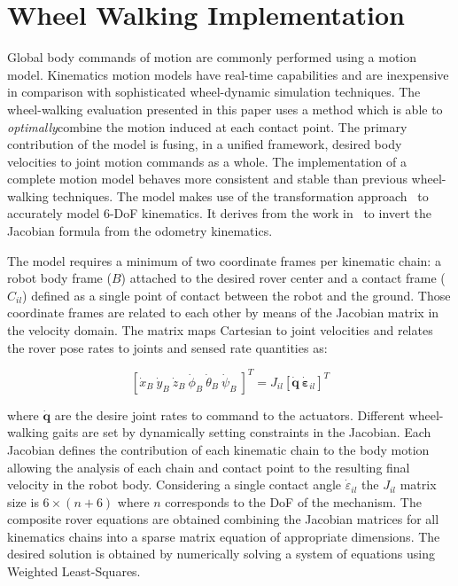 \documentclass[a4paper,twocolumn]{esapub2005} %
\begin{document}
\section{Wheel Walking Implementation}

Global body commands of motion are commonly performed using a motion model.
Kinematics motion models have real-time capabilities and are inexpensive in
comparison with sophisticated wheel-dynamic simulation techniques.  The
wheel-walking evaluation presented in this paper uses a method which is able to
\textit{optimally}\footnotemark[2] combine the motion induced at each contact
point. The primary contribution of the model is fusing, in a unified framework,
desired body velocities to joint motion commands as a whole.  The
implementation of a complete motion model behaves more consistent and stable
than previous wheel-walking techniques. The model makes use of the
transformation approach~\cite{Tarokh2005} to accurately model 6-DoF kinematics.
It derives from the work in~\cite{Hidalgo-Carrio2014} to invert the Jacobian
formula from the odometry kinematics.

The model requires a minimum of two coordinate frames per kinematic chain:
a robot body frame ($B$) attached to the desired rover center and a
contact frame ($C_{il}$) defined as a single point of contact between the robot
and the ground. Those coordinate frames are related to each other by means of
the Jacobian matrix in the velocity domain. The matrix maps Cartesian to joint velocities and
relates the rover pose rates to joints and sensed rate quantities as:

\begin{equation}
    \left[\dot{x}_{B} ~ \dot{y}_{B} ~ \dot{z}_{B} ~ \dot{\phi}_{B} ~ \dot{\theta}_{B} ~ \dot{\psi}_{B} ~ \right]^T =
    J_{il} \left[\boldsymbol{\dot{q}} ~ \boldsymbol{\dot{\varepsilon}}_{il} \right]^T
\label{eq:wheeljacobian}
\end{equation}

where $\boldsymbol{\dot{q}}$ are the desire joint rates to command to the
actuators.  Different wheel-walking gaits are set by dynamically setting
constraints in the Jacobian. Each Jacobian defines the contribution of each
kinematic chain to the body motion allowing the analysis of each chain and
contact point to the resulting final velocity in the robot body.  Considering a
single contact angle $\dot{\varepsilon}_{il}$ the $J_{il}$ matrix size is $6
\times (n + 6)$ where $n$ corresponds to the DoF of the mechanism.  The
composite rover equations are obtained combining the Jacobian matrices for all
kinematics chains into a sparse matrix equation of appropriate dimensions. The
desired solution is obtained by numerically solving a system of equations using
Weighted Least-Squares.
\end{document}
